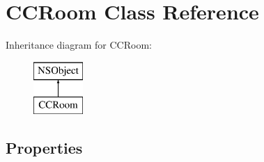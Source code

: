 \hypertarget{interface_c_c_room}{}\section{C\+C\+Room Class Reference}
\label{interface_c_c_room}
Inheritance diagram for C\+C\+Room\+:\begin{figure}[H]
\begin{center}
\leavevmode
\includegraphics[height=2.000000cm]{interface_c_c_room}
\end{center}
\end{figure}
\subsection*{Properties}
